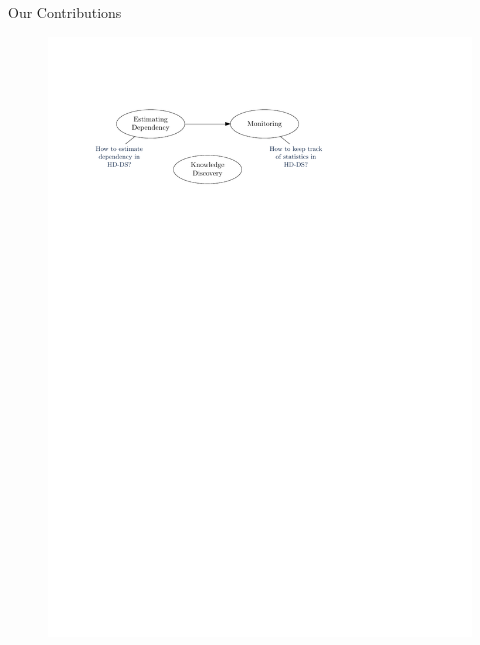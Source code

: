 \documentclass[16pt,usenames,dvipsnames, notheorems]{beamer}
\theoremstyle{definition}
\theoremstyle{example}
\theoremstyle{plain}
\begin{document}
\begin{frame}{Our Contributions}
\begin{figure}
\begin{overprint}
		 \includegraphics[width=1.0 \linewidth]{figures/outline_c_2-compressed.pdf}

\end{overprint}
\end{figure}
\end{frame}
\end{document}
